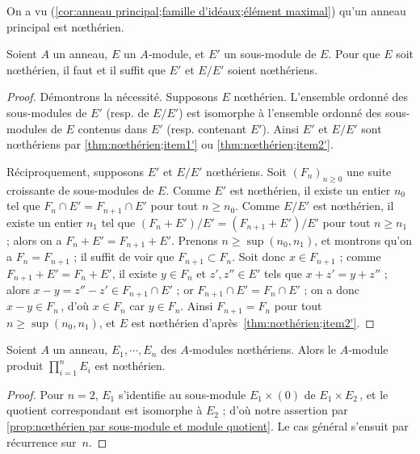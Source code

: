 \documentclass[11pt, %
  title in boldface,
  theorem in new line,
  theorem numbering = section,
  number theorems separately,
  simple name,
]{beaulivre}
\begin{document}
    On a vu (\cref{cor:anneau principal;famille d'idéaux;élément maximal}) qu'un anneau principal est nœthérien.

    \begin{proposition}\label{prop:nœthérien par sous-module et module quotient}
        Soient \( A \) un anneau, \( E \) un \( A \)‑module, et \( E' \) un sous-module de \( E \). Pour que \( E \) soit nœthérien, il faut et il suffit que \( E' \) et \( E/E' \) soient nœthériens.
    \end{proposition}
    \begin{proof}
        Démontrons la nécessité. Supposons \( E \) nœthérien. L'ensemble ordonné des sous-modules de \( E' \) (resp. de \( E/E' \)) est isomorphe à l'ensemble ordonné des sous-modules de \( E \) contenus dans \( E' \) (resp. contenant \( E' \)). Ainsi \( E' \) et \( E/E' \) sont nœthériens par \ref{thm:nœthérien;item1'} ou \ref{thm:nœthérien;item2'}.

        Réciproquement, supposons \( E' \) et \( E/E' \) nœthériens. Soit \( (F_n)_{n \geqslant 0} \) une suite croissante de sous-modules de \( E \). Comme \( E' \) est nœthérien, il existe un entier \( n_0 \) tel que \( F_n \cap E' = F_{n+1} \cap E' \) pour tout \( n \geqslant n_0 \). Comme \( E/E' \) est nœthérien, il existe un entier \( n_1 \) tel que \( (F_n+E')/E' = (F_{n+1}+E')/E' \) pour tout \( n \geqslant n_1 \) ; alors on a \( F_n+E' = F_{n+1}+E' \). Prenons \( n \geqslant \sup(n_0,n_1) \), et montrons qu'on a \( F_n = F_{n+1} \) ; il suffit de voir que \( F_{n+1} \subset F_n \). Soit donc \( x \in F_{n+1} \) ; comme \( F_{n+1} + E' = F_n + E' \), il existe \( y \in F_n \) et \( z', z'' \in E' \) tels que \( x+z' = y+z'' \) ; alors \( x-y = z''-z' \in F_{n+1} \cap E' \) ; or \( F_{n+1} \cap E' = F_n \cap E' \) ; on a donc \( x-y \in F_n \)\,, d'où \( x \in F_n \) car \( y \in F_n \). Ainsi \( F_{n+1} = F_n \) pour tout \( n \geqslant \sup(n_0,n_1) \), et \( E \) est nœthérien d'après~\ref{thm:nœthérien;item2'}.
    \end{proof}

    \begin{corollary}\label{cor:module de type fini sur un anneau nœthérien}
        Soient \( A \) un anneau, \( E_1, \cdots, E_n \) des \( A \)‑modules nœthériens. Alors le \( A \)‑module produit \( \prod_{i=1}^n E_i \) est nœthérien.
    \end{corollary}
    \begin{proof}
        Pour \( n = 2 \), \( E_1 \) s'identifie au sous-module \( E_1 \times (0) \) de \( E_1 \times E_2 \)\,, et le quotient correspondant est isomorphe à \( E_2 \) ; d'où notre assertion par \cref{prop:nœthérien par sous-module et module quotient}. Le cas général s'ensuit par récurrence sur~\( n \).
    \end{proof}
\end{document}
